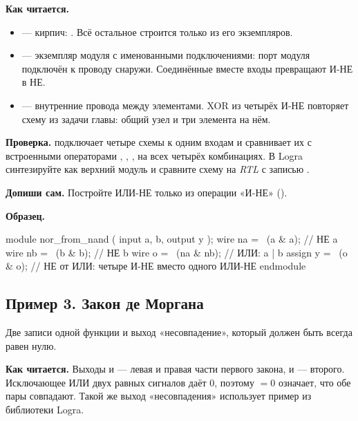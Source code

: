 \textbf{Как читается.}
\begin{itemize}
  \item {} --- кирпич: . Всё остальное строится только из его экземпляров.
  \item {} --- экземпляр модуля с именованными подключениями: порт  модуля подключён к проводу  снаружи. Соединённые вместе входы превращают И-НЕ в НЕ.
  \item {} --- внутренние провода между элементами. XOR из четырёх И-НЕ повторяет схему из задачи главы: общий узел  и три элемента на нём.
\end{itemize}
\textbf{Проверка.}  подключает четыре схемы к одним
входам и сравнивает их с встроенными операторами \code{\textasciitilde},
\code{\&}, \code{|}, \code{\^{}} на всех четырёх комбинациях. В Logra
синтезируйте  как верхний модуль и сравните схему на \emph{RTL}
с записью .

\textbf{Допиши сам.} Постройте ИЛИ-НЕ только из операции «И-НЕ»
().

\textbf{Образец.}\par\nopagebreak
\begin{vcode}
module nor_from_nand (
    input  a, b,
    output y
);
    wire na = ~(a & a);        // НЕ a
    wire nb = ~(b & b);        // НЕ b
    wire o  = ~(na & nb);      // ИЛИ: a | b
    assign y = ~(o & o);       // НЕ от ИЛИ: четыре И-НЕ вместо одного ИЛИ-НЕ
endmodule
\end{vcode}

\subsection{Пример 3. Закон де Моргана}

Две записи одной функции и выход «несовпадение», который должен быть всегда
равен нулю.


\textbf{Как читается.} Выходы  и  --- левая и правая части
первого закона,  и  --- второго. Исключающее ИЛИ двух равных
сигналов даёт 0, поэтому  $=0$ означает, что обе пары совпадают.
Такой же выход «несовпадения» использует пример  из библиотеки Logra.

